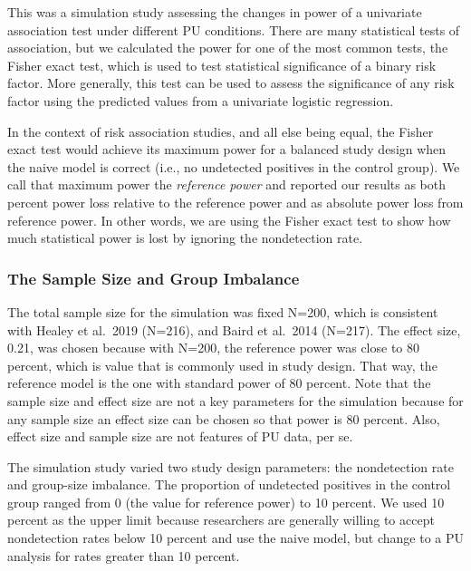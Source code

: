 \documentclass[
]{article}
\begin{document}
This was a simulation study assessing the changes in power of a
univariate association test under different PU conditions. There are
many statistical tests of association, but we calculated the power for
one of the most common tests, the Fisher exact test, which is used to
test statistical significance of a binary risk factor. More generally,
this test can be used to assess the significance of any risk factor
using the predicted values from a univariate logistic regression.

In the context of risk association studies, and all else being equal,
the Fisher exact test would achieve its maximum power for a balanced
study design when the naive model is correct (i.e., no undetected
positives in the control group). We call that maximum power the
\emph{reference power} and reported our results as both percent power
loss relative to the reference power and as absolute power loss from
reference power. In other words, we are using the Fisher exact test to
show how much statistical power is lost by ignoring the nondetection
rate.

\hypertarget{the-sample-size-and-group-imbalance}{%
\subsubsection{The Sample Size and Group
Imbalance}\label{the-sample-size-and-group-imbalance}}

The total sample size for the simulation was fixed N=200, which is
consistent with Healey et al.~2019 (N=216), and Baird et al.~2014
(N=217). \cite{bcioa14} \cite{hmhcbhkr19} The effect size, 0.21, was
chosen because with N=200, the reference power was close to 80 percent,
which is value that is commonly used in study design. That way, the
reference model is the one with standard power of 80 percent. Note that
the sample size and effect size are not a key parameters for the
simulation because for any sample size an effect size can be chosen so
that power is 80 percent. Also, effect size and sample size are not
features of PU data, per se.

The simulation study varied two study design parameters: the
nondetection rate and group-size imbalance. The proportion of undetected
positives in the control group ranged from 0 (the value for reference
power) to 10 percent. We used 10 percent as the upper limit because
researchers are generally willing to accept nondetection rates below 10
percent and use the naive model, but change to a PU analysis for rates
greater than 10 percent. \cite{bd20}
\end{document}
